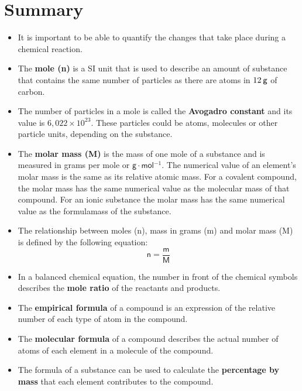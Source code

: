             \section{Summary}
            \nopagebreak
      \label{m38712*id285735}\begin{itemize}[noitemsep]
            \label{m38712*uid107}\item It is important to be able to quantify the changes that take place during a chemical reaction.
\label{m38712*uid108}\item The \textbf{mole (n)} is a SI unit that is used to describe an amount of substance that contains the same number of particles as there are atoms in $12\phantom{\rule{2pt}{0ex}}\mathsf{g}$ of carbon.
\label{m38712*uid109}\item The number of particles in a mole is called the \textbf{Avogadro constant} and its value is $6,022\ensuremath{\times}{10}^{23}$. These particles could be atoms, molecules or other particle units, depending on the substance.
\label{m38712*uid110}\item The \textbf{molar mass (M)} is the mass of one mole of a substance and is measured in grams per mole or $\mathsf{g}\ensuremath{\cdot}\mathsf{mol}{}^{-1}$. The numerical value of an element's molar mass is the same as its relative atomic mass. For a covalent compound, the molar mass has the same numerical value as the molecular mass of that compound. For an ionic substance the molar mass has the same numerical value as the formulamass of the substance.
\label{m38712*uid111}\item The relationship between moles (n), mass in grams (m) and molar mass (M) is defined by the following equation:
\label{m38712*id285862}\nopagebreak\noindent{}
    \begin{equation*}
    \mathsf{n}=\frac{\mathsf{m}}{\mathsf{M}}
      \end{equation*}
    \label{m38712*uid112}\item In a balanced chemical equation, the number in front of the chemical symbols describes the \textbf{mole ratio} of the reactants and products.
\label{m38712*uid113}\item The \textbf{empirical formula} of a compound is an expression of the relative number of each type of atom in the compound.
\label{m38712*uid114}\item The \textbf{molecular formula} of a compound describes the actual number of atoms of each element in a molecule of the compound.
\label{m38712*uid115}\item The formula of a substance can be used to calculate the \textbf{percentage by mass} that each element contributes to the compound.

\end{itemize}
